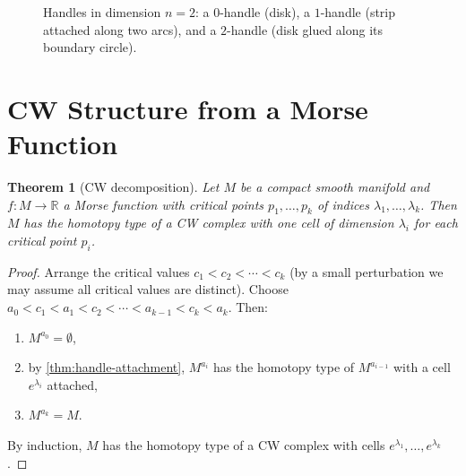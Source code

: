 \documentclass[12pt,a4paper,openany]{book}
\newtheorem{theorem}{Theorem}[section]
\theoremstyle{definition}
\theoremstyle{remark}
\newcommand{\R}{\mathbb{R}}
\begin{document}
\begin{figure}[ht]
\centering
{}
\caption{Handles in dimension $n=2$: a $0$-handle (disk), a $1$-handle
(strip attached along two arcs), and a $2$-handle (disk glued along its boundary circle).}\label{fig:handles-2d}
\end{figure}

\section{CW Structure from a Morse Function}\label{sec:cw-morse}

\begin{theorem}[CW decomposition]\label{thm:cw-morse}
Let $M$ be a compact smooth manifold and $f\colon M \to \R$ a Morse
function with critical points $p_1,\dots,p_k$ of indices
$\lambda_1,\dots,\lambda_k$. Then $M$ has the homotopy type of a
CW complex with one cell of dimension $\lambda_i$ for each critical point $p_i$.
\end{theorem}

\begin{proof}
Arrange the critical values $c_1 < c_2 < \cdots < c_k$ (by a small
perturbation we may assume all critical values are distinct).
Choose $a_0 < c_1 < a_1 < c_2 < \cdots < a_{k-1} < c_k < a_k$.
Then:
\begin{enumerate}[label=(\roman*)]
  \item $M^{a_0} = \emptyset$,
  \item by \autoref{thm:handle-attachment}, $M^{a_i}$ has the homotopy type of
    $M^{a_{i-1}}$ with a cell $e^{\lambda_i}$ attached,
  \item $M^{a_k} = M$.
\end{enumerate}
By induction, $M$ has the homotopy type of a CW complex with cells
$e^{\lambda_1},\dots,e^{\lambda_k}$.
\end{proof}
\end{document}
